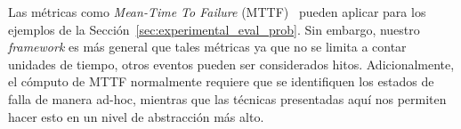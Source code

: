 Las métricas como \emph{Mean-Time To Failure} (MTTF)~\cite{ReliabilityBook}  pueden aplicar para los ejemplos de la Sección~\ref{sec:experimental_eval_prob}.
Sin embargo, nuestro \textit{framework} es más general que tales métricas ya que no se limita a contar unidades de tiempo, otros eventos pueden ser considerados hitos.  Adicionalmente, el cómputo de MTTF normalmente requiere que se identifiquen los estados de falla de manera ad-hoc, mientras que las técnicas presentadas aquí nos permiten hacer esto en un nivel de abstracción más alto.




 
		







